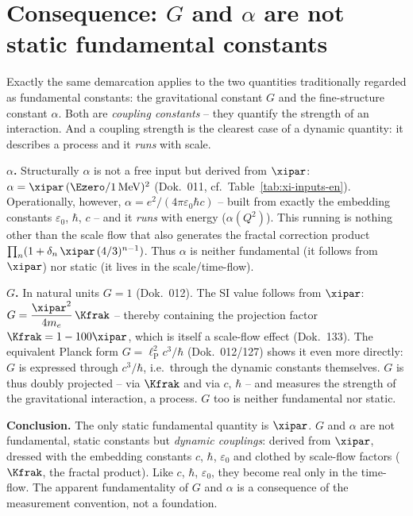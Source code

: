\section{Consequence: $G$ and $\alpha$ are not static fundamental constants}
\label{sec:G-alpha}

Exactly the same demarcation applies to the two quantities traditionally regarded
as fundamental constants: the gravitational constant $G$ and the fine-structure
constant $\alpha$. Both are \emph{coupling constants} -- they quantify the
strength of an interaction. And a coupling strength is the clearest case of a
dynamic quantity: it describes a process and it \emph{runs} with scale.

\textbf{$\alpha$.} Structurally $\alpha$ is not a free input but derived from
$\xipar$: $\alpha=\xipar\,(\Ezero/1\,\mathrm{MeV})^2$ (Dok.~011,
cf.~Table~\ref{tab:xi-inputs-en}). Operationally, however,
$\alpha=e^2/(4\pi\varepsilon_0\hbar c)$ -- built from exactly the embedding
constants $\varepsilon_0$, $\hbar$, $c$ -- and it \emph{runs} with energy
($\alpha(Q^2)$). This running is nothing other than the scale flow that also
generates the fractal correction product
$\prod_n(1+\delta_n\,\xipar\,(4/3)^{n-1})$. Thus $\alpha$ is neither fundamental
(it follows from $\xipar$) nor static (it lives in the scale/time-flow).

\textbf{$G$.} In natural units $G=1$ (Dok.~012). The SI value follows from
$\xipar$: $G=\dfrac{\xipar^2}{4m_e}\,\Kfrak$ -- thereby containing the projection
factor $\Kfrak=1-100\xipar$, which is itself a scale-flow effect (Dok.~133). The
equivalent Planck form $G=\ell_{\mathrm P}^2 c^3/\hbar$ (Dok.~012/127) shows it
even more directly: $G$ is expressed through $c^3/\hbar$, i.e.\ through the
dynamic constants themselves. $G$ is thus doubly projected -- via $\Kfrak$ and via
$c$, $\hbar$ -- and measures the strength of the gravitational interaction, a
process. $G$ too is neither fundamental nor static.

\begin{result}
\textbf{Conclusion.} The only static fundamental quantity is $\xipar$. $G$ and
$\alpha$ are not fundamental, static constants but \emph{dynamic couplings}:
derived from $\xipar$, dressed with the embedding constants $c$, $\hbar$,
$\varepsilon_0$ and clothed by scale-flow factors ($\Kfrak$, the fractal product).
Like $c$, $\hbar$, $\varepsilon_0$, they become real only in the time-flow. The
apparent fundamentality of $G$ and $\alpha$ is a consequence of the measurement
convention, not a foundation.
\end{result}

